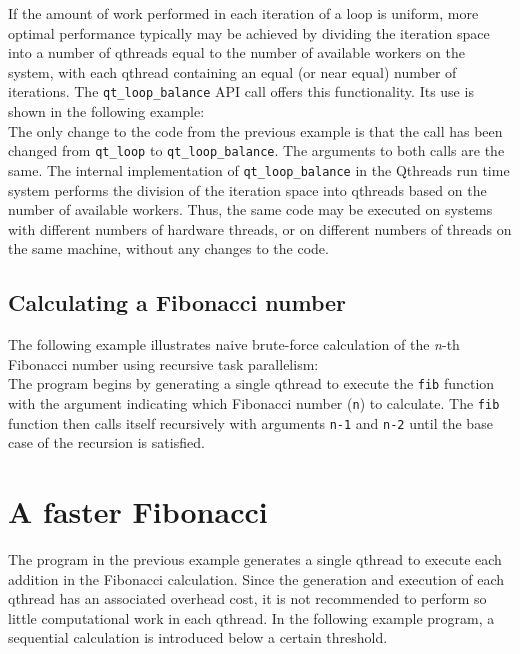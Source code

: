 \documentclass[12pt]{article}
\begin{document}
If the amount of work performed in each iteration of a loop is uniform, more optimal performance typically may be achieved by dividing the iteration space into a number of qthreads equal to the number of available workers on the system, with each qthread containing an equal (or near equal) number of iterations.  The {\tt qt\_loop\_balance} API call offers this functionality.  Its use is shown in the following example:
\\


The only change to the code from the previous example is that the call has been changed from {\tt qt\_loop} to {\tt qt\_loop\_balance}.  The arguments to both calls are the same.  The internal implementation of {\tt qt\_loop\_balance} in the Qthreads run time system performs the division of the iteration space into qthreads based on the number of available workers.  Thus, the same code may be executed on systems with different numbers of hardware threads, or on different numbers of threads on the same machine, without any changes to the code.

\subsection{Calculating a Fibonacci number}

The following example illustrates naive brute-force calculation of the {\it n}-th Fibonacci number using recursive task parallelism:
\\


The program begins by generating a single qthread to execute the {\tt fib} function with the argument indicating which Fibonacci number ({\tt n}) to calculate.  The {\tt fib} function then calls itself recursively with arguments {\tt n-1} and {\tt n-2} until the base case of the recursion is satisfied.

\section{A faster Fibonacci}
The program in the previous example generates a single qthread to execute each addition in the Fibonacci calculation.  Since the generation and execution of each qthread has an associated overhead cost, it is not recommended to perform so little computational work in each qthread.  In the following example program, a sequential calculation is introduced below a certain threshold.
\\

\end{document}
